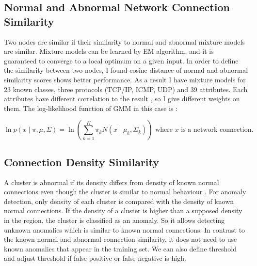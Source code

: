 \subsection{Normal and Abnormal Network Connection Similarity}
\label{subsec:normalabnormalsimilarity}
Two nodes are similar if their similarity to normal and abnormal mixture models are similar. 
Mixture models can be learned by EM algorithm, and it is guaranteed to converge to a local optimum on a given input. 
In order to define the similarity between two nodes, I found cosine distance of normal and abnormal similarity scores shows better performance. 
As a result I have mixture models for 23 known classes, three protocols (TCP/IP, ICMP, UDP) and 39 attributes. 
Each attributes have different correlation to the result \cite{olusola10}\cite{kayacik05}, so I give different weights on them.
The log-likelihood function of GMM in this case is :

\begin{equation}
    \ln p(x \mid \pi, \mu, \Sigma) = \ln (\sum_{k=1}^K \pi_k N(x \mid \mu_k, \Sigma_k)) \text{ where } x \text{ is a network connection.}
\end{equation}

%

\subsection{Connection Density Similarity}
\label{subsec:densitysimilarity}
A cluster is abnormal if its density differs from density of known normal connections even though the cluster is similar to normal behaviour \cite{ester96}. 
For anomaly detection, only density of each cluster is compared with the density of known normal connections. 
If the density of a cluster is higher than a supposed density in the region, the cluster is classified as an anomaly. 
So it allows detecting unknown anomalies which is similar to known normal connections. 
In contrast to the known normal and abnormal connection similarity, it does not need to use known anomalies that appear in the training set. 
We can also define threshold and adjust threshold if false-positive or false-negative is high. 

